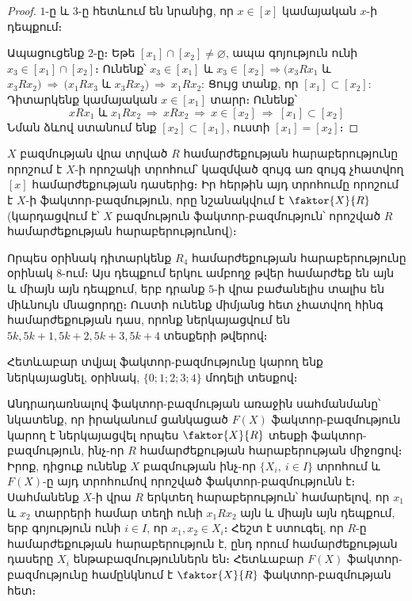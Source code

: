 \documentclass[./main.tex]{subfiles}
\begin{document}
\begin{proof}
$1$-ը և $3$-ը հետևում են նրանից, որ $x \in [x]$ կամայական $x$-ի դեպքում։
\par Ապացուցենք $2$-ը։ Եթե $[x_1]\cap [x_2] \neq \varnothing $, ապա գոյություն ունի $ x_3 \in [x_1] \cap [x_2]$։ Ունենք՝ $x_3 \in [x_1]$ և $x_3 \in [x_2] \Rightarrow (x_3Rx_1$ և $x_3Rx_2) \ \Rightarrow\ (x_1Rx_3$ և $x_3Rx_2)\ \Rightarrow\ x_1Rx_2$: Ցույց տանք, որ $[x_1]\subset[x_2]$: Դիտարկենք կամայական $x\in[x_1]$ տարր։ Ունենք՝
\[xRx_1 \text{ և } x_1Rx_2 \ \Rightarrow\ xRx_2 \ \Rightarrow\ x \in [x_2]  \ \Rightarrow\  [x_1]\subset [x_2]\]
Նման ձևով ստանում ենք $[x_2] \subset [x_1]$, ուստի $[x_1]=[x_2]$։
\end{proof} 
\begin{hetevanq5}\label{ch2cor1} 
$X$ բազմության վրա տրված $R$ համարժեքության հա\-րա\-բե\-րու\-թյու\-նը որոշում է $X$-ի որոշակի տրոհում՝ կազմված զույգ առ զույգ չհատ\-վող $[x]$ հա\-մար\-ժե\-քու\-թյան դասերից։ Իր հերթին այդ տրոհումը որոշում է $X$-ի ֆակտոր-բազմություն, որը նշանակվում է $\faktor{X}{R}$ (կարդացվում է՝ $X$ բազմություն ֆակտոր-բազմություն՝ որոշված $R$ համարժեքության հարաբերությունով)։
\end{hetevanq5}
 \par Որպես օրինակ դիտարկենք $R_4$ համարժեքության հարաբերությունը օրինակ $8\textrm{-ում}$։ Այս դեպքում երկու ամբողջ թվեր համարժեք են այն և միայն այն դեպքում, երբ դրանք $5$-ի վրա բաժանելիս տալիս են միևնույն մնացորդը։ Ուստի ունենք միմյանց հետ չհատվող հինգ համարժեքության դաս, որոնք ներկայացվում են \linebreak $5k, {5k+1}, {5k+2}, 5k+3, 5k+4 $ տեսքերի թվերով։
 \par Հետևաբար տվյալ ֆակտոր-բազմությունը կարող ենք ներկայացնել, օրինակ, ${\{0;1;2;3;4\}}$ մոդելի տեսքով։
\par Անդրադառնալով ֆակտոր-բազմության առաջին սահմանմանը՝ նկատենք, որ իրականում ցանկացած $F(X)$ ֆակտոր-բազմություն կարող է ներկայացվել որպես ${\faktor{X}{R}}$ տեսքի ֆակտոր-բազմություն, ինչ-որ $R$ համարժեքության հարաբերության միջոցով։ Իրոք, դիցուք ունենք $X$ բազմության ինչ-որ $\{X_i,\ i \in I\}$ տրոհում և $F(X)$-ը այդ տրոհումով որոշված ֆակտոր-բազմությունն է։ Սահմանենք $X$-ի վրա $R$ երկտեղ հա\-րա\-բե\-րու\-թյուն՝ համարելով, որ $x_1$ և $x_2$ տարրերի համար տեղի ունի $x_1Rx_2$ այն և միայն այն դեպքում, երբ գոյություն ունի $i \in I$, որ $x_1,x_2 \in X_i$։ Հեշտ է ստուգել, որ $R\textrm{-ը}$ համարժեքության հարաբերություն է, ընդ որում համարժեքության դասերը $X_i$ ենթաբազմություններն են։ Հետևաբար $F(X)$ ֆակտոր-բազմությունը համընկնում է ${\faktor{X}{R}}$ ֆակտոր-բազմության հետ։
\end{document}
